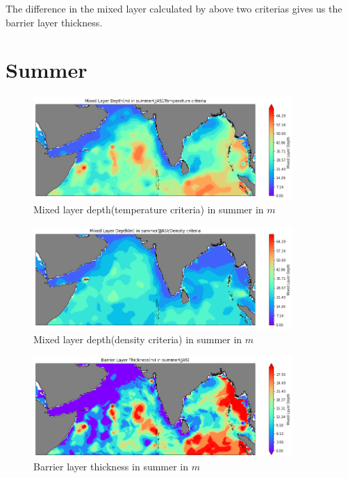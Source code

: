 \documentclass[20pt]{article}
\begin{document}
The difference in the mixed layer calculated by above two criterias gives us the barrier layer thickness.

\section*{Summer}

\begin{figure}
    \centering
    \includegraphics[width=0.88\textwidth]{temp_summer.png}
    \caption{Mixed layer depth(temperature criteria) in summer in $m$}
\end{figure}

\begin{figure}
    \centering
    \includegraphics[width=0.88\textwidth]{density_summer.png}
    \caption{Mixed layer depth(density criteria) in summer in $m$}
\end{figure}

\begin{figure}
    \centering
    \includegraphics[width=0.88\textwidth]{blt_summer.png}
    \caption{Barrier layer thickness in summer in $m$}
\end{figure}
\end{document}

